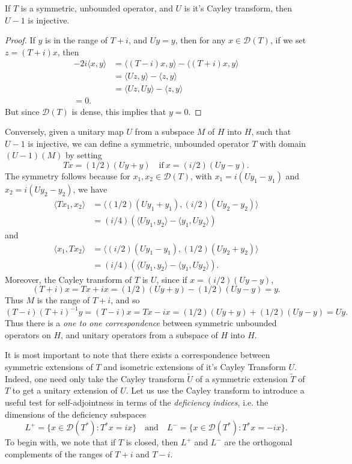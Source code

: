 \begin{lemma}
    If $T$ is a symmetric, unbounded operator, and $U$ is it's Cayley transform, then $U - 1$ is injective.
\end{lemma}
\begin{proof}
    If $y$ is in the range of $T + i$, and $Uy = y$, then for any $x \in \mathcal{D}(T)$, if we set $z = (T + i)x$, then
    \begin{align*}
        -2i \langle x, y \rangle &= \langle (T - i) x, y \rangle - \langle (T + i) x, y \rangle\\
        &= \langle Uz, y \rangle - \langle z, y \rangle\\
        &= \langle Uz, Uy \rangle - \langle z, y \rangle\\ = 0.
    \end{align*}
    But since $\mathcal{D}(T)$ is dense, this implies that $y = 0$.
\end{proof}

Conversely, given a unitary map $U$ from a subspace $M$ of $H$ into $H$, such that $U - 1$ is injective, we can define a symmetric, unbounded operator $T$ with domain $(U - 1)(M)$ by setting
%
\[ Tx = (1/2)(Uy + y) \quad\text{if}\ x = (i/2) (Uy - y). \]
%
The symmetry follows because for $x_1,x_2 \in \mathcal{D}(T)$, with $x_1 = i(Uy_1 - y_1)$ and $x_2 = i(Uy_2 - y_2)$, we have
%
\begin{align*}
    \langle Tx_1, x_2 \rangle &= \langle (1/2)(Uy_1 + y_1), (i/2)(Uy_2 - y_2) \rangle\\
    &= (i/4) \left( \langle Uy_1, y_2 \rangle - \langle y_1, Uy_2 \rangle \right)
\end{align*}
%
and
%
\begin{align*}
    \langle x_1, Tx_2 \rangle &= \langle (i/2)(Uy_1 - y_1), (1/2)(Uy_2 + y_2) \rangle\\
    &= (i/4) \left(  \langle Uy_1, y_2 \rangle - \langle y_1, Uy_2 \rangle \right).
\end{align*}
%
Moreover, the Cayley transform of $T$ is $U$, since if $x = (i/2)(Uy - y)$,
%
\[ (T + i) x = Tx + ix = (1/2)(Uy + y) - (1/2)(Uy - y) = y. \]
%
Thus $M$ is the range of $T + i$, and so
%
\[ (T - i)(T + i)^{-1}y = (T - i)x = Tx - ix = (1/2)(Uy + y) + (1/2)(Uy - y) = Uy. \]
%
Thus there is a \emph{one to one correspondence} between symmetric unbounded operators on $H$, and unitary operators from a subspace of $H$ into $H$.

It is most important to note that there exists a correspondence between symmetric extensions of $T$ and isometric extensions of it's Cayley Transform $U$. Indeed, one need only take the Cayley transform $\tilde{U}$ of a symmetric extension $\tilde{T}$ of $T$ to get a unitary extension of $U$. 
Let us use the Cayley transform to introduce a useful test for self-adjointness in terms of the \emph{deficiency indices}, i.e. the dimensions of the deficiency subspaces
%
\[ L^+ = \{ x \in \mathcal{D}(T^*) : T^* x = i x \} \quad\text{and}\quad L^- = \{ x \in \mathcal{D}(T^*): T^* x = -i x \}. \]
%
To begin with, we note that if $T$ is closed, then $L^+$ and $L^-$ are the orthogonal complements of the ranges of $T + i$ and $T - i$.

